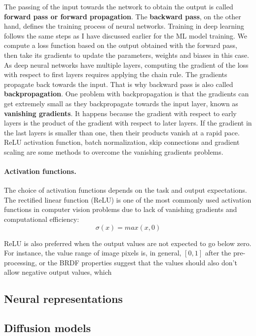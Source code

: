 The passing of the input towards the network to obtain the output is called \textbf{forward pass or forward propagation}. The \textbf{backward pass}, on the other hand, defines the training process of neural networks. Training in deep learning follows the same steps as I have discussed earlier for the ML model training. We compute a loss function based on the output obtained with the forward pass, then take its gradients to update the parameters, weights and biases in this case. As deep neural networks have multiple layers, computing the gradient of the loss with respect to first layers requires applying the chain rule. The gradients propagate back towards the input. That is why backward pass is also called \textbf{backpropagation}. One problem with backpropagation is that the gradients can get extremely small as they backpropagate towards the input layer, known as \textbf{vanishing gradients}. It happens because the gradient with respect to early layers is the product of the gradient with respect to later layers. If  the gradient in the last layers is smaller than one, then their products vanish at a rapid pace. ReLU activation function, batch normalization, skip connections and gradient scaling are some methods to overcome the vanishing gradients problems.

\paragraph{Activation functions.} The choice of activation functions depends on the task and output expectations. The rectified linear function (ReLU) is one of the most commonly used activation functions in computer vision problems due to lack of vanishing gradients and computational efficiency:
\begin{equation}
\sigma(x) = max(x, 0)
\end{equation}

ReLU is also preferred when the output values are not expected to go below zero. For instance, the value range of image pixels is, in general, $[0, 1]$ after the pre-processing, or the BRDF properties suggest that the values should  
also don't allow negative output values, which 

\subsection{Neural representations}
\subsection{Diffusion models}